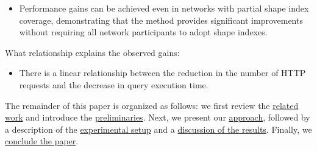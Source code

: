 \begin{Rone}
\begin{description}
\begin{itemize}
			      \item[\textbf{H6}] Performance gains can be achieved even in networks with partial shape index coverage, demonstrating that the method provides significant improvements without requiring all network participants to adopt shape indexes.
		      \end{itemize}
		\item[Explainability.] What relationship explains the observed gains:
		      \begin{itemize}
			      \item[\textbf{H7}] There is a linear relationship between the reduction in the number of \ac{HTTP} requests and the decrease in query execution time.
		      \end{itemize}
	\end{description}
\end{Rone}

The remainder of this paper is organized as follows:
we first review the \hyperref[sec:related_work]{related work} and introduce the \hyperref[sec:preliminaries]{preliminaries}.
Next, we present our \hyperref[sec:approach]{approach}, followed by a description of the \hyperref[sec:experiment]{experimental setup} and a \hyperref[sec:result]{discussion of the results}.
Finally, we \hyperref[sec:conclusion]{conclude the paper}.
